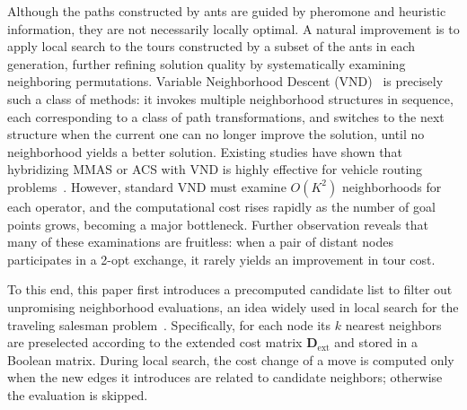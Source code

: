 \documentclass[pdflatex,sn-basic,Numbered]{sn-jnl}
\begin{document}
Although the paths constructed by ants are guided by pheromone and heuristic information, they are not necessarily locally optimal. A natural improvement is to apply local search to the tours constructed by a subset of the ants in each generation, further refining solution quality by systematically examining neighboring permutations. Variable Neighborhood Descent (VND)~\cite{ref24} is precisely such a class of methods: it invokes multiple neighborhood structures in sequence, each corresponding to a class of path transformations, and switches to the next structure when the current one can no longer improve the solution, until no neighborhood yields a better solution. Existing studies have shown that hybridizing MMAS or ACS with VND is highly effective for vehicle routing problems~\cite{ref25}. However, standard VND must examine $O(K^2)$ neighborhoods for each operator, and the computational cost rises rapidly as the number of goal points grows, becoming a major bottleneck. Further observation reveals that many of these examinations are fruitless: when a pair of distant nodes participates in a 2-opt exchange, it rarely yields an improvement in tour cost.

To this end, this paper first introduces a precomputed candidate list to filter out unpromising neighborhood evaluations, an idea widely used in local search for the traveling salesman problem~\cite{ref26}. Specifically, for each node its $k$ nearest neighbors are preselected according to the extended cost matrix $\mathbf{D}_{\mathrm{ext}}$ and stored in a Boolean matrix. During local search, the cost change of a move is computed only when the new edges it introduces are related to candidate neighbors; otherwise the evaluation is skipped.
\end{document}
